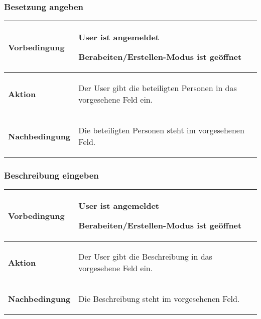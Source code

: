 \documentclass[11pt,a4paper,titlepage,portrait,ngerman]{scrartcl}
\begin{document}
\subsubsection*{Besetzung angeben}
\vspace{2.5mm}
\noindent
\begin{tabular}{|p{}||p{}|}
\hline \rule[-2ex]{0pt}{5.5ex} \textbf{Vorbedingung} & {
	\begin{list}{\textendash}{\vspace{-5mm}}
		\item{User ist angemeldet}
		\item{Berabeiten/Erstellen-Modus ist geöffnet}
	\end{list}
} \\ 
\hline \rule[-2ex]{0pt}{5.5ex} \textbf{Aktion} & {
	\begin{list}{\textendash}{\vspace{-5mm}}
		\item{Der User gibt die beteiligten Personen in das vorgesehene Feld ein.}
	\end{list}
} \\ 
\hline \rule[-2ex]{0pt}{5.5ex} \textbf{Nachbedingung} & {
	\begin{list}{\textendash}{\vspace{-5mm}}
		\item{Die beteiligten Personen steht im vorgesehenen Feld.}
	\end{list}
}  \\
\hline 
\end{tabular}

\subsubsection*{Beschreibung eingeben}
\vspace{2.5mm}
\noindent
\begin{tabular}{|p{}||p{}|}
\hline \rule[-2ex]{0pt}{5.5ex} \textbf{Vorbedingung} & {
	\begin{list}{\textendash}{\vspace{-5mm}}
		\item{User ist angemeldet}
		\item{Berabeiten/Erstellen-Modus ist geöffnet}
	\end{list}
} \\ 
\hline \rule[-2ex]{0pt}{5.5ex} \textbf{Aktion} & {
	\begin{list}{\textendash}{\vspace{-5mm}}
		\item{Der User gibt die Beschreibung in das vorgesehene Feld ein.}
	\end{list}
} \\ 
\hline \rule[-2ex]{0pt}{5.5ex} \textbf{Nachbedingung} & {
	\begin{list}{\textendash}{\vspace{-5mm}}
		\item{Die Beschreibung steht im vorgesehenen Feld.}
	\end{list}
}  \\
\hline 
\end{tabular}
\end{document}
